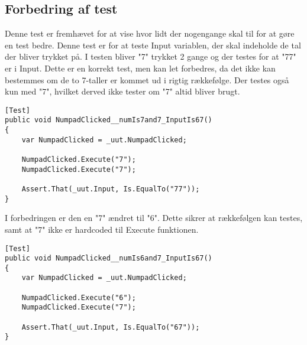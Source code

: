 \subsection{Forbedring af test}
Denne test er fremhævet for at vise hvor lidt der nogengange skal til for at gøre en test bedre. Denne test er for at teste Input variablen, der skal indeholde de tal der bliver trykket på. I testen bliver "7" trykket 2 gange og der testes for at "77" er i Input. Dette er en korrekt test, men kan let forbedres, da det ikke kan bestemmes om de to 7-taller er kommet ud i rigtig rækkefølge. Der testes også kun med "7", hvilket derved ikke tester om "7" altid bliver brugt.
\begin{lstlisting}
[Test]
public void NumpadClicked__numIs7and7_InputIs67()
{
    var NumpadClicked = _uut.NumpadClicked;

    NumpadClicked.Execute("7");
    NumpadClicked.Execute("7");

    Assert.That(_uut.Input, Is.EqualTo("77"));
}
\end{lstlisting}


I forbedringen er den en "7" ændret til "6". Dette sikrer at rækkefølgen kan testes, samt at "7" ikke er hardcoded til Execute funktionen.
\begin{lstlisting}
[Test]
public void NumpadClicked__numIs6and7_InputIs67()
{
    var NumpadClicked = _uut.NumpadClicked;

    NumpadClicked.Execute("6");
    NumpadClicked.Execute("7");

    Assert.That(_uut.Input, Is.EqualTo("67"));
}
\end{lstlisting}


